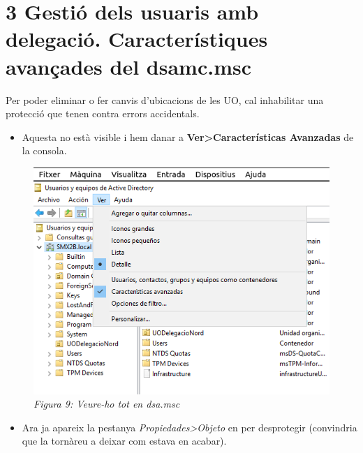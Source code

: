 \documentclass[
  a4paper,
]{article}
\providecommand{\tightlist}{%
  \setlength{\itemsep}{0pt}\setlength{\parskip}{0pt}}
\begin{document}
\section{3 Gestió dels usuaris amb delegació. Característiques avançades
del
dsamc.msc}\label{gestiuxf3-dels-usuaris-amb-delegaciuxf3.-caracteruxedstiques-avanuxe7ades-del-dsamc.msc}

Per poder eliminar o fer canvis d'ubicacions de les UO, cal inhabilitar
una protecció que tenen contra errors accidentals.

\begin{itemize}
\tightlist
\item
  Aquesta no està visible i hem danar a
  \textbf{Ver\textgreater Características Avanzadas} de la consola.
\end{itemize}

\begin{figure}
\centering
\includegraphics{png/dsaCarateristicasAvanzadas.png}
\caption{\emph{Figura 9: Veure-ho tot en dsa.msc}}
\end{figure}

\begin{itemize}
\tightlist
\item
  Ara ja apareix la pestanya \emph{Propiedades\textgreater Objeto} en
  per desprotegir (convindria que la tornàreu a deixar com estava en
  acabar).
\end{itemize}
\end{document}
